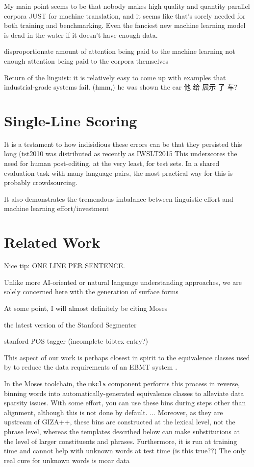 My main point seems to be that nobody makes high quality and quantity parallel corpora JUST for machine translation, and it seems like that's sorely needed for both training and benchmarking.
Even the fanciest new machine learning model is dead in the water if it doesn't have enough data.

disproportionate amount of attention being paid to the machine learning
not enough attention being paid to the corpora themselves

Return of the linguist: it is relatively easy to come up with examples that industrial-grade systems fail. (hmm,)
he was shown the car
他 给 展示 了 车?

\section{Single-Line Scoring}

It is a testament to how indisidious these errors can be that they persisted this long (tst2010 was distributed as recently as IWSLT2015
This underscores the need for human post-editing, at the very least, for test sets.
In a shared evaluation task with many language pairs, the most practical way for this is probably crowdsourcing.

It also demonstrates the tremendous imbalance between linguistic effort and machine learning effort/investment


\section{Related Work}
\label{sec:related}

Nice tip: ONE LINE PER SENTENCE.

Unlike more AI-oriented or natural language understanding approaches, we are solely concerned here with the generation of surface forms

At some point, I will almost definitely be citing Moses 

the latest version of the Stanford Segmenter 

stanford POS tagger (incomplete bibtex entry?) 

This aspect of our work is perhaps closest in spirit to the equivalence classes used by  to reduce the data requirements of an EBMT system .

In the Moses toolchain, the {\small \tt mkcls} component  performs this process in reverse, binning words into automatically-generated equivalence classes to alleviate data sparsity issues.
With some effort, you can use these bins during steps other than alignment, although this is not done by default.
...
Moreover, as they are upstream of GIZA++, these bins are constructed at the lexical level, not the phrase level, whereas the templates described below can make substitutions at the level of larger constituents and phrases.
Furthermore, it is run at training time and cannot help with unknown words at test time (is this true??)
The only real cure for unknown words is moar data


